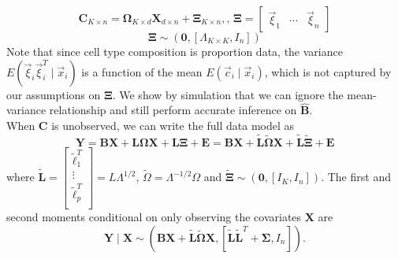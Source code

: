 \documentclass{article}
\begin{document}
\begin{equation}
\bm{C}_{K \times n} = \bm{\Omega}_{K \times d}\bm{X}_{d \times n} + \bm{\Xi}_{K \times n}, \text{, } \bm{\Xi} = \left[ \begin{matrix}
\vec{\xi}_1 & \cdots & \vec{\xi}_n
\end{matrix} \right]
\end{equation}
\begin{equation}
\bm{\Xi} \sim \left( \bm{0}, \left[\Lambda_{K \times K}, I_n\right] \right)
\end{equation}
Note that since cell type composition is proportion data, the variance $E\left( \vec{\xi}_i \vec{\xi}_i^T\mid \vec{x}_i\right)$ is a function of the mean $E\left( \vec{c}_i \mid \vec{x}_i \right)$, which is not captured by our assumptions on $\bm{\Xi}$. We show by simulation that we can ignore the mean-variance relationship and still perform accurate inference on $\hat{\bm{B}}$.\\
\indent When $\bm{C}$ is unobserved, we can write the full data model as
\begin{equation}
\bm{Y} = \bm{B}\bm{X} + \bm{L} \bm{\Omega} \bm{X} + \bm{L}\bm{\Xi} + \bm{E} = \bm{B}\bm{X} + \tilde{\bm{L}} \tilde{\bm{\Omega}} \bm{X} + \tilde{\bm{L}}\tilde{\bm{\Xi}} + \bm{E}
\end{equation}
where $\tilde{\bm{L}} = \left[ \begin{matrix}
\tilde{\bm{\ell}}_1^T\\
\vdots\\
\tilde{\bm{\ell}}_p^T\\
\end{matrix} \right] = L\Lambda^{1/2}$, $\tilde{\Omega} = \Lambda^{-1/2}\Omega$ and $\tilde{\bm{\Xi}} \sim \left( \bm{0}, \left[ I_K, I_n\right] \right)$. The first and second moments conditional on only observing the covariates $\bm{X}$ are
\begin{equation}
\bm{Y} \mid \bm{X} \sim\left( \bm{B}\bm{X} + \tilde{\bm{L}} \tilde{\bm{\Omega}} \bm{X}, \left[\tilde{\bm{L}} \tilde{\bm{L}}^T + \bm{\Sigma}, I_n\right] \right).
\end{equation}
\end{document}
